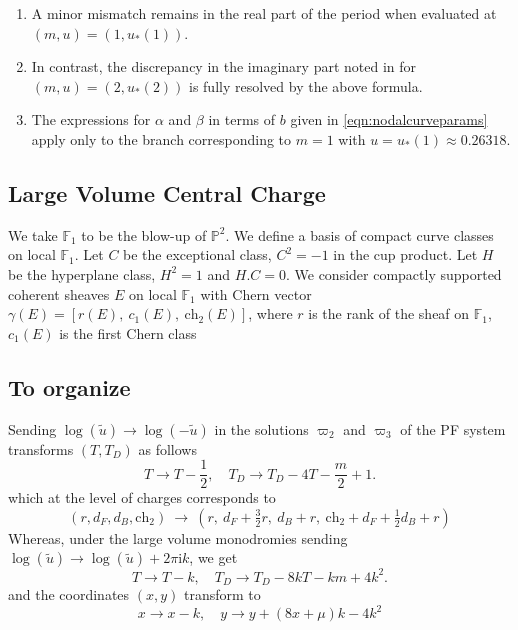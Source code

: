 \documentclass[11pt, a4paper]{article}
\newcommand{\ii}{\mathrm{i}}
\def\rishi#1{{\color{magenta} #1}}
\newcommand{\ch}{\mathrm{ch}}
\numberwithin{equation}{section}
\begin{document}
\vspace{-1em}
\rishi{
  \begin{enumerate}
    \item A minor mismatch remains in the real part of the period when evaluated at $(m,u) = (1, u_*(1))$.  
    \item In contrast, the discrepancy in the imaginary part noted in \cite{Marino:LocalF1Notes} for $(m,u) = (2, u_*(2))$ is fully resolved by the above formula.
    \item The expressions for $\alpha$ and $\beta$ in terms of $b$ given in \cref{eqn:nodalcurveparams} apply only to the branch corresponding to $m=1$ with $u=u_*(1)\approx 0.26318$.
  \end{enumerate}
}


\subsection{Large Volume Central Charge}

We take $\mathbb{F}_1$ to be the blow-up of $\mathbb{P}^2$. We define a basis of compact curve classes on local $\mathbb{F}_1$. Let $C$ be the exceptional class, $C^2 = -1$ in the cup product. Let $H$ be the hyperplane class, $H^2 = 1$ and $H.C = 0$. We consider compactly supported coherent sheaves $E$ on local $\mathbb{F}_1$ with Chern vector $\gamma(E) = [r(E), \ c_1(E), \ \mathrm{ch}_2(E)]$, where $r$ is the rank of the sheaf on $\mathbb{F}_1$, $c_1(E)$ is the first Chern class


\subsection{To organize}

Sending $\log(\tilde{u}) \to \log(-\tilde{u})$ in the solutions $\varpi_2$ and $\varpi_3$ of the PF system transforms $(T, T_D)$ as follows
\begin{equation}
  T \to T - \frac{1}{2}, \quad T_D \to T_D - 4T -\frac{m}{2}+1.
\end{equation}
which at the level of charges corresponds to
\begin{equation}
  (r, d_F, d_B, \ch_2) \ \rightarrow \ \left( r, \ d_F + \tfrac32 r, \ d_B + r, \ \ch_2 + d_F + \tfrac12 d_B + r \right)
\end{equation}
Whereas, under the large volume monodromies sending $\log(\tilde{u}) \to \log(\tilde{u})+ 2 \pi \ii k$, we get
\begin{equation}
  T \to T - k, \quad T_D \to T_D - 8 k T - k m + 4 k^2.
\end{equation}
and the coordinates $(x, y)$ transform to
\begin{equation}
  x \to x - k, \quad y \to y + (8 x + \mu) k - 4k^2
\end{equation}
\end{document}
